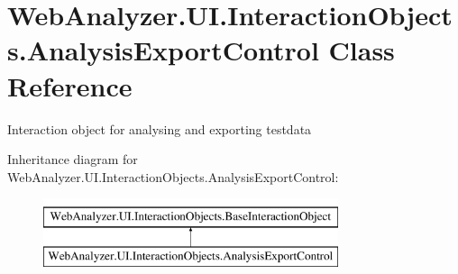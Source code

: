 \hypertarget{class_web_analyzer_1_1_u_i_1_1_interaction_objects_1_1_analysis_export_control}{}\section{Web\+Analyzer.\+U\+I.\+Interaction\+Objects.\+Analysis\+Export\+Control Class Reference}
\label{class_web_analyzer_1_1_u_i_1_1_interaction_objects_1_1_analysis_export_control}


Interaction object for analysing and exporting testdata  


Inheritance diagram for Web\+Analyzer.\+U\+I.\+Interaction\+Objects.\+Analysis\+Export\+Control\+:\begin{figure}[H]
\begin{center}
\leavevmode
\includegraphics[height=2.000000cm]{class_web_analyzer_1_1_u_i_1_1_interaction_objects_1_1_analysis_export_control}
\end{center}
\end{figure}
